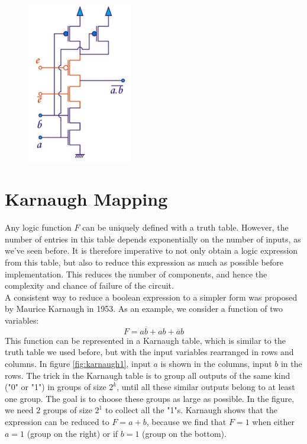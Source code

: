 \begin{figure}[h!]
	\centering
	\includegraphics[height=7cm]{figures/ch13/inhib3.jpg}
	\caption{}
	\label{fig:inhib3}
\end{figure}


\section{Karnaugh Mapping}
\label{sec:karnaugh}

Any logic function $F$ can be uniquely defined with a truth table. However, the number of entries in this table depends exponentially on the number of inputs, as we've seen before. It is therefore imperative to not only obtain a logic expression from this table, but also to reduce this expression as much as possible before implementation. This reduces the number of components, and hence the complexity and chance of failure of the circuit.\\
A consistent way to reduce a boolean expression to a simpler form was proposed by Maurice Karnaugh in 1953. As an example, we consider a function of two variables:
$$F = a \overline{b} + a b + \overline{a}b$$
This function can be represented in a Karnaugh table, which is similar to the truth table we used before, but with the input variables rearranged in rows and columns. In figure \ref{fig:karnaugh1}, input $a$ is shown in the columns, input $b$ in the rows. The trick in the Karnaugh table is to group all outputs of the same kind ("0" or "1") in groups of size $2^k$, until all these similar outputs belong to at least one group. The goal is to choose these groups as large as possible. In the figure, we need $2$ groups of size $2^1$ to collect all the "1"s. Karnaugh shows that the expression can be reduced to $F = a + b$, because we find that $F = 1$ when either $a=1$ (group on the right) or if $b=1$ (group on the bottom).

